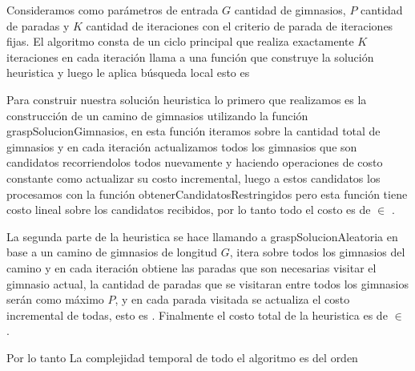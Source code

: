 Consideramos como parámetros de entrada $G$ cantidad de gimnasios, $P$ cantidad de paradas y $K$ cantidad de iteraciones con el criterio de parada de iteraciones fijas.
El algoritmo consta de un ciclo principal que realiza exactamente $K$ iteraciones en cada iteración llama a una función que construye la solución heuristica y luego le aplica búsqueda local esto es  

Para construir nuestra solución heuristica lo primero que realizamos es la construcción de un camino de gimnasios utilizando la función graspSolucionGimnasios, en esta función iteramos sobre la cantidad total de gimnasios y en cada iteración actualizamos todos los gimnasios que son candidatos recorriendolos todos nuevamente y haciendo operaciones de costo constante como actualizar su costo incremental, luego a estos candidatos los procesamos con la función obtenerCandidatosRestringidos pero esta función tiene costo lineal sobre los candidatos recibidos, por lo tanto todo el costo es de  $\in$ .

La segunda parte de la heuristica se hace llamando a graspSolucionAleatoria en base a un camino de gimnasios de longitud $G$, itera sobre todos los gimnasios del camino y en cada iteración obtiene las paradas que son necesarias visitar el gimnasio actual, la cantidad de paradas que se visitaran entre todos los gimnasios serán como máximo $P$, y en cada parada visitada se actualiza el costo incremental de todas, esto es . Finalmente el costo total de la heuristica es de  $\in$ .

Por lo tanto La complejidad temporal de todo el algoritmo es del orden 


